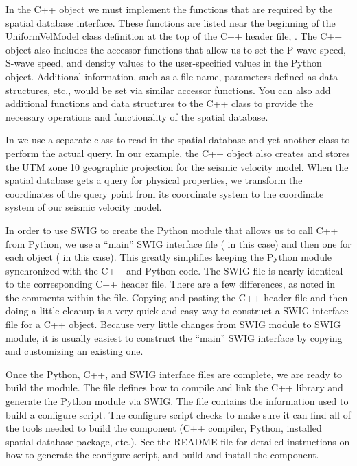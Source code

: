 In the C++ object we must implement the functions that are required
by the spatial database interface. These functions are listed near
the beginning of the UniformVelModel class definition at the top of
the C++ header file, . The C++ object also
includes the accessor functions that allow us to set the P-wave speed,
S-wave speed, and density values to the user-specified values in the
Python object. Additional information, such as a file name, parameters
defined as data structures, etc., would be set via similar accessor
functions. You can also add additional functions and data structures
to the C++ class to provide the necessary operations and functionality
of the spatial database. 

In  we use a separate class to read in the spatial
database and yet another class to perform the actual query. In our
example, the C++ object also creates and stores the UTM zone 10
geographic projection for the seismic velocity model. When the spatial
database gets a query for physical properties, we transform the
coordinates of the query point from its coordinate system to the
coordinate system of our seismic velocity model.

In order to use SWIG to create the Python module that allows us to
call C++ from Python, we use a ``main'' SWIG interface file
( in this case) and then one for each
object ( in this case). This greatly
simplifies keeping the Python module synchronized with the C++ and
Python code. The  SWIG file is nearly
identical to the corresponding C++ header file.  There are a few
differences, as noted in the comments within the file.  Copying and
pasting the C++ header file and then doing a little cleanup is a very
quick and easy way to construct a SWIG interface file for a C++
object. Because very little changes from SWIG module to SWIG module,
it is usually easiest to construct the ``main'' SWIG interface by
copying and customizing an existing one.

Once the Python, C++, and SWIG interface files are complete, we are
ready to build the module. The  file defines how
to compile and link the C++ library and generate the Python module via
SWIG. The  file contains the information used
to build a configure script. The configure script checks to make sure
it can find all of the tools needed to build the component (C++
compiler, Python, installed spatial database package, etc.). See the
README file for detailed instructions on how to generate the configure
script, and build and install the component.

